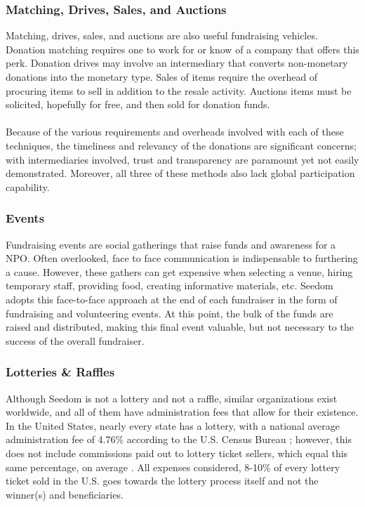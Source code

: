 \documentclass[11pt]{article}
\begin{document}
\subsubsection{Matching, Drives, Sales, and Auctions}

Matching, drives, sales, and auctions are also useful fundraising vehicles. Donation matching requires one to work for or know of a company that offers this perk. Donation drives may involve an intermediary that converts non-monetary donations into the monetary type. Sales of items require the overhead of procuring items to sell in addition to the resale activity. Auctions items must be solicited, hopefully for free, and then sold for donation funds.\\\\
Because of the various requirements and overheads involved with each of these techniques, the timeliness and relevancy of the donations are significant concerns; with intermediaries involved, trust and transparency are paramount yet not easily demonstrated. Moreover, all three of these methods also lack global participation capability.

\subsubsection{Events}

Fundraising events are social gatherings that raise funds and awareness for a NPO. Often overlooked, face to face communication is indispensable to furthering a cause. However, these gathers can get expensive when selecting a venue, hiring temporary staff, providing food, creating informative materials, etc. Seedom adopts this face-to-face approach at the end of each fundraiser in the form of fundraising and volunteering events. At this point, the bulk of the funds are raised and distributed, making this final event valuable, but not necessary to the success of the overall fundraiser.

\subsubsection{Lotteries \& Raffles}

Although Seedom is not a lottery and not a raffle, similar organizations exist worldwide, and all of them have administration fees that allow for their existence. In the United States, nearly every state has a lottery, with a national average administration fee of 4.76\% according to the U.S. Census Bureau \cite{3}; however, this does not include commissions paid out to lottery ticket sellers, which equal this same percentage, on average \cite{4}. All expenses considered, 8-10\% of every lottery ticket sold in the U.S. goes towards the lottery process itself and not the winner(s) and beneficiaries.
\end{document}
